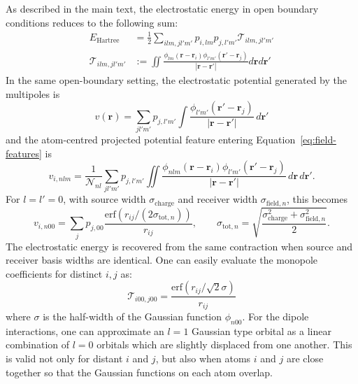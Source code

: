 \documentclass[aps,%
superscriptaddress,
 amsmath,amssymb,
floatfix,
twocolumn
]{revtex4-2}
\begin{document}
As described in the main text, the electrostatic energy in open boundary conditions reduces to the following sum:
\begin{align}
    E_\text{Hartree} &= \frac{1}{2}\sum_{ilm,jl'm'} p_{i,lm}p_{j,l'm'} \mathcal{T}_{ilm,jl'm'} \label{eq:SI_def_E_Hartree} \\
    \mathcal{T}_{ilm,jl'm'} &:=\iint \frac{\phi_{lm}(\mathbf{r}-\mathbf{r}_i)\phi_{l'm'}(\mathbf{r}'-\mathbf{r}_j)}{|\mathbf{r}-\mathbf{r}'|} d\mathbf{r} d\mathbf{r}'
    \label{eq:SI_def_T_coeffs}
\end{align}
In the same open-boundary setting, the electrostatic potential generated by the multipoles is
\begin{equation}
v(\mathbf{r})=\sum_{jl'm'} p_{j,l'm'}\int \frac{\phi_{l'm'}(\mathbf{r}'-\mathbf{r}_j)}{|\mathbf{r}-\mathbf{r}'|}\,d\mathbf{r}'
\label{eq:si_realspace_potential_field}
\end{equation}
and the atom-centred projected potential feature entering Equation~\ref{eq:field-features} is
\begin{equation}
v_{i,nlm}=\frac{1}{\mathcal N_{nl}}\sum_{jl'm'} p_{j,l'm'}\iint
\frac{\phi_{nlm}(\mathbf{r}-\mathbf{r}_i)\phi_{l'm'}(\mathbf{r}'-\mathbf{r}_j)}{|\mathbf{r}-\mathbf{r}'|}
\,d\mathbf{r}\,d\mathbf{r}' .
\label{eq:si_realspace_projected_potential}
\end{equation}
For $l=l'=0$, with source width $\sigma_{\text{charge}}$ and receiver width $\sigma_{\text{field},n}$, this becomes
\begin{equation}
v_{i,n00}
=
\sum_j p_{j,00}
\frac{\mathrm{erf}\!\left(r_{ij}/(2\sigma_{\mathrm{tot},n})\right)}{r_{ij}},
\qquad
\sigma_{\mathrm{tot},n}=\sqrt{\frac{\sigma_{\text{charge}}^2+\sigma_{\text{field},n}^2}{2}}.
\label{eq:si_realspace_l0_projector}
\end{equation}
The electrostatic energy is recovered from the same contraction when source and receiver basis widths are identical.
One can easily evaluate the monopole coefficients for distinct $i,j$ as:
\begin{equation}
\mathcal{T}_{i00,j00} = \frac{\text{erf}(r_{ij}/\sqrt{2}\sigma)}{r_{ij}}
\label{eq:SI_monopole_energy}
\end{equation}
where $\sigma$ is the half-width of the Gaussian function $\phi_{n00}$. For the dipole interactions, one can approximate an $l=1$ Gaussian type orbital as a linear combination of $l=0$ orbitals which are slightly displaced from one another. This is valid not only for distant $i$ and $j$, but also when atoms $i$ and $j$ are close together so that the Gaussian functions on each atom overlap.
\end{document}
